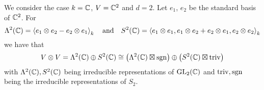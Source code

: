 \begin{example}
  We consider the case $k = \mathbb{C}$, $V = \mathbb{C}^2$ and $d = 2$.
  Let $e_1$, $e_2$ be the standard basis of $\mathbb{C}^2$.
  For
  \[
      \Lambda^2(\mathbb{C})
    = \left\langle  e_1 \mathbin{\otimes} e_2 - e_2 \mathbin{\otimes} e_1  \right\rangle_k
    \quad\text{and}\quad
      S^2(\mathbb{C})
    = \left\langle  e_1 \mathbin{\otimes} e_1, e_1 \mathbin{\otimes} e_2 + e_2 \mathbin{\otimes} e_1, e_2 \mathbin{\otimes} e_2  \right\rangle_k
  \]
  we have that
  \[
          V \mathbin{\otimes} V
    =     \Lambda^2(\mathbb{C}) \oplus S^2(\mathbb{C})
    \cong        \left( \Lambda^2(\mathbb{C}) \mathbin{\boxtimes} \operatorname{sgn} \right)
          \oplus \left( S^2(\mathbb{C}) \mathbin{\boxtimes} \operatorname{triv} \right)
  \]
  with $\Lambda^2(\mathbb{C}), S^2(\mathbb{C})$ being irreducible representations of $\operatorname{GL}_2(\mathbb{C})$ and $\operatorname{triv}, \operatorname{sgn}$ being the irreducible representations of $S_2$.
  
%     

\end{example}
